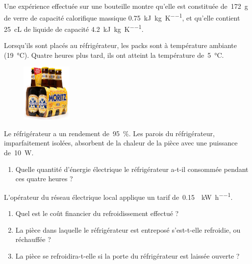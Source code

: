 	Une expérience effectuée sur une bouteille montre qu’elle est constituée de~\SI{172}{\gram} de verre de capacité calorifique massique \SI{0,75}{\kilo\joule\per\kilogram\per\kelvin}, et qu’elle contient \SI{25}{\centi\liter} de liquide de capacité \SI{4,2}{\kilo\joule\per\kilogram\per\kelvin}.
	
	Lorsqu’ils sont placés au réfrigérateur, les packs sont à température ambiante (\SI{19}{\degreeCelsius}). Quatre heures plus tard, ils ont atteint la température de~\SI{5}{\degreeCelsius}.
	
	\begin{figure}[htp] %
		\begin{center}
		\includegraphics[width=2.5cm]{images/6-pack.jpg}
		\end{center}
		\label{fig_six_pack}
	\end{figure}
	
	Le réfrigérateur a un rendement de~\SI{95}{\percent}. Les parois du réfrigérateur, imparfaitement isolées, absorbent de la chaleur de la pièce avec une puissance de~\SI{10}{\watt}.

	
	\begin{enumerate}
		\item Quelle quantité d’énergie électrique le réfrigérateur a-t-il consommée pendant ces quatre heures ?
	\end{enumerate}
	
	L’opérateur du réseau électrique local applique un tarif de~\SI[per-mode=symbol]{0,15}{\euroo\per\kilo\watt\per\hour}.
	
	\begin{enumerate}
		\item Quel est le coût financier du refroidissement effectué ?
		\item La pièce dans laquelle le réfrigérateur est entreposé s’est-t-elle refroidie, ou réchauffée ?
		\item La pièce se refroidira-t-elle si la porte du réfrigérateur est laissée ouverte ?
	\end{enumerate}


